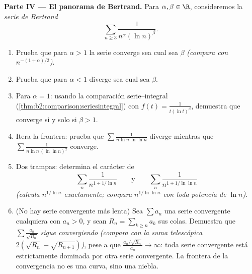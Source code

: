 \begin{problem}[{Problema de fin de semana --- $\zeta(2) = \pi^2/6$ y
el panorama de Bertrand}]
\medskip
\noindent\textbf{Parte IV --- El panorama de Bertrand.} Para
$\alpha, \beta \in \R$, consideremos la \emph{serie de Bertrand}
\[
\sum_{n \geq 3} \frac{1}{n^{\alpha}(\ln n)^{\beta}} .
\]
\begin{enumerate}[resume]
  \item Prueba que para $\alpha > 1$ la serie converge sea cual sea
        $\beta$ \emph{(compara con $n^{-(1+\alpha)/2}$)}.
  \item Prueba que para $\alpha < 1$ diverge sea cual sea $\beta$.
  \item Para $\alpha = 1$: usando la comparación serie--integral
        (\cref{thm:b2:comparison:seriesintegral}) con $f(t) =
        \frac{1}{t(\ln t)^\beta}$, demuestra que converge si y solo
        si $\beta > 1$.
  \item Itera la frontera: prueba que $\sum\frac{1}{n\ln n\,\ln\ln
        n}$ diverge mientras que $\sum\frac{1}{n\ln n\,(\ln\ln
        n)^2}$ converge.
  \item Dos trampas: determina el carácter de
        \[
        \sum_n \frac{1}{n^{1 + 1/\ln n}}
        \qquad\text{y}\qquad
        \sum_n \frac{1}{n^{1 + 1/\ln\ln n}}
        \]
        \emph{(calcula $n^{1/\ln n}$ exactamente; compara
        $n^{1/\ln\ln n}$ con toda potencia de $\ln n$)}.
  \item (No hay serie convergente más lenta) Sea $\sum a_n$ una
        serie convergente cualquiera con $a_n > 0$, y sean $R_n =
        \sum_{k \geq n}a_k$ sus colas. Demuestra que $\sum
        \frac{a_n}{\sqrt{R_n}}$ \emph{sigue convergiendo}
        \emph{(compara con la suma telescópica $2(\sqrt{R_n} -
        \sqrt{R_{n+1}})$)}, pese a que
        $\frac{a_n/\sqrt{R_n}}{a_n} \to \infty$: toda serie
        convergente está estrictamente dominada por otra serie
        convergente. La frontera de la convergencia no es una curva,
        sino una niebla.
\end{enumerate}


\end{problem}
